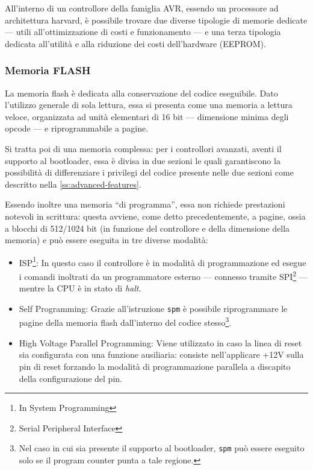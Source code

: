 All'interno di un controllore della famiglia AVR, essendo un processore ad architettura harvard, è possibile trovare due diverse tipologie di memorie dedicate --- utili all'ottimizzazione di costi e funzionamento --- e una terza tipologia dedicata all'utilità e alla riduzione dei costi dell'hardware (EEPROM).

\subsubsection{Memoria FLASH}
La memoria flash è dedicata alla conservazione del codice eseguibile.
Dato l'utilizzo generale di sola lettura, essa si presenta come una memoria a lettura veloce, organizzata ad unità elementari di 16 bit --- dimensione minima degli opcode\cite{avr:isa} --- e riprogrammabile a pagine.

Si tratta poi di una memoria complessa: per i controllori avanzati, aventi il supporto al bootloader, essa è divisa in due sezioni le quali garantiscono la possibilità di differenziare i privilegi del codice presente nelle due sezioni come descritto nella \cref{ss:advanced-features}.

Essendo inoltre una memoria ``di programma'', essa non richiede prestazioni notevoli in scrittura: questa avviene, come detto precedentemente, a pagine, ossia a blocchi di 512/1024 bit (in funzione del controllore e della dimensione della memoria) e può essere eseguita in tre diverse modalità:

\begin{itemize}
    \item ISP\footnote{In System Programming}: In questo caso il controllore è in modalità di programmazione ed esegue i comandi inoltrati da un programmatore esterno --- connesso tramite SPI\footnote{Serial Peripheral Interface} --- mentre la CPU è in stato di \textit{halt}.
    \item Self Programming: Grazie all'istruzione \texttt{spm} è possibile riprogrammare le pagine della memoria flash dall'interno del codice stesso\footnote{Nel caso in cui sia presente il supporto al bootloader, \texttt{spm} può essere eseguito solo se il program counter punta a tale regione.}.
    \item High Voltage Parallel Programming: Viene utilizzato in caso la linea di reset sia configurata con una funzione ausiliaria: consiste nell'applicare +12V sulla pin di reset forzando la modalità di programmazione parallela a discapito della configurazione del pin\cite[sec 28.6]{avr:m328p}.
\end{itemize}

